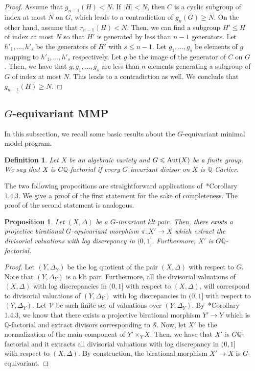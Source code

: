 \documentclass{amsart}
\renewcommand{\qq}{\mathbb{Q}}
\newtheorem{proposition}[theorem]{Proposition}
\newtheorem{definition}[theorem]{Definition}
\theoremstyle{remark}
\numberwithin{equation}{section}
\begin{document}
\begin{proof}
Assume that $g_{n-1}(H)<N$.
If $|H|<N$, then $C$ is a cyclic subgroup of index at most $N$ on $G$,
which leads to a contradiction of $g_n(G)\geq N$.
On the other hand, assume that
$r_{n-1}(H)<N$.
Then, we can find a subgroup $H'\leqslant H$ of index at most $N$
so that $H'$ is generated by less than $n-1$ generators.
Let $h'_1,\dots, h'_s$ be the generators of $H'$ with $s\leq n-1$.
Let $g_1,\dots,g_s$ be elements of $g$ mapping to $h'_1,\dots, h'_s$ respectively.
Let $g$ be the image of the generator of $C$ on $G$.
Then, we have that $g,g_1,\dots,g_s$ are less than $n$ elements
generating a subgroup of $G$ of index at most $N$.
This leads to a contradiction as well.
We conclude that $g_{n-1}(H)\geq N$.
\end{proof}

\subsection{$G$-equivariant MMP}\label{subsec:g-equiv-mmp}
In this subsection, we recall some basic results about the $G$-equivariant minimal model program.

\begin{definition}{\em 
Let $X$ be an algebraic variety and $G\leqslant {\rm Aut}(X)$ be a finite group.
We say that $X$ is {\em $G\qq$-factorial} if every $G$-invariant divisor on $X$ is $\qq$-Cartier.
}
\end{definition}

The two following propositions are straightforward applications of~\cite{BCHM10}*{Corollary 1.4.3}.
We give a proof of the first statement for the sake of completeness.
The proof of the second statement is analogous.

\begin{proposition}\label{prop:existence-g-term}
Let $(X,\Delta)$ be a $G$-invariant klt pair.
Then, there exists a projective birational $G$-equivariant morphism
$\pi\colon X'\rightarrow X$ which extract the divisorial valuations
with log discrepancy in $(0,1]$.
Furthermore, $X'$ is $G\qq$-factorial.
\end{proposition}

\begin{proof}
Let $(Y,\Delta_Y)$ be the log quotient of the pair $(X,\Delta)$ with respect to $G$.
Note that $(Y,\Delta_Y)$ is a klt pair.
Furthermore, all the divisorial valuations of $(X,\Delta)$ with log discrepancies
in $(0,1]$ with respect to $(X,\Delta)$, will correspond to 
divisorial valuations of $(Y,\Delta_Y)$ with log discrepancies in $(0,1]$ with respect to $(Y,\Delta_Y)$. Let $\mathcal{V}$ be such finite set of valuations over $(Y,\Delta_Y)$.
By~\cite{BCHM10}*{Corollary 1.4.3}, we know that there exists a projective birational morphism $Y'\rightarrow Y$ which is $\qq$-factorial and
extract divisors corresponding to $\mathcal{S}$.
Now, let $X'$ be the normalization of the main component of $Y'\times_Y X$.
Then, we have that $X'$ is $G\qq$-factorial and it extracts all divisorial valuations
with log discrepancy in $(0,1]$ with respect to $(X,\Delta)$.
By construction, the birational morphism $X'\rightarrow X$ is $G$-equivariant.
\end{proof}
\end{document}

